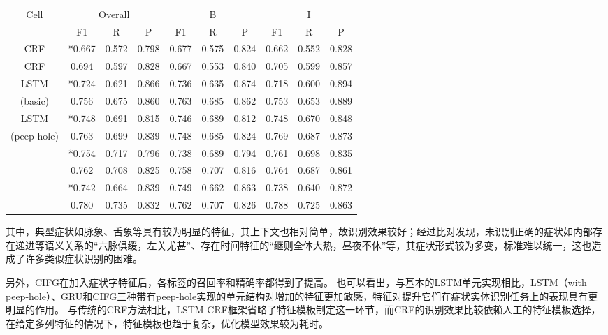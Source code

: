 \begin{table}[H]
    \centering
    \begin{tabular}{cccccccccc}
        \toprule
            \multirow{2}{*}{Cell} &\multicolumn{3}{c}{Overall} &\multicolumn{3}{c}{B} &\multicolumn{3}{c}{I}\\
            \cmidrule(lr){2-4} \cmidrule(lr){5-7} \cmidrule(lr){8-10}
            & F1 & R & P & F1 & R & P & F1 & R & P\\
        \midrule
            CRF & *0.667 & 0.572 & 0.798 & 0.677 & 0.575 & 0.824 & 0.662 & 0.552 & 0.828\\
            CRF & 0.694 & 0.597 & 0.828 & 0.667 & 0.553 & 0.840 & 0.705 & 0.599 & 0.857\\
        \midrule
            LSTM & *0.724 & 0.621 & 0.866 & 0.736 & 0.635 & 0.874 & 0.718 & 0.600 & 0.894\\
            (basic) & 0.756 & 0.675 & 0.860 & 0.763 & 0.685 & 0.862 & 0.753 & 0.653 & 0.889\\
            LSTM & *0.748 & 0.691 & 0.815 & 0.746 & 0.689 & 0.812 & 0.748 & 0.670 & 0.848\\
            (peep-hole) & 0.763 & 0.699 & 0.839 & 0.748 & 0.685 & 0.824 & 0.769 & 0.687 & 0.873\\
            \multirow{2}{2cm}{\centering{GRU}} & *0.754 & 0.717 & 0.796 & 0.738 & 0.689 & 0.794 & 0.761 & 0.698 & 0.835\\
                                 & 0.762 & 0.708 & 0.825 & 0.758 & 0.707 & 0.816 & 0.764 & 0.687 & 0.861\\
            \multirow{2}{2cm}{\centering{CIFG}} & *0.742 & 0.664 & 0.839 & 0.749 & 0.662 & 0.863 & 0.738 & 0.640 & 0.872\\
                                  & 0.780 & 0.735 & 0.832 & 0.762 & 0.707 & 0.826 & 0.788 & 0.725 & 0.863\\
        \bottomrule
    \end{tabular}
    \label{tab:tab1}
\end{table}

其中，典型症状如脉象、舌象等具有较为明显的特征，其上下文也相对简单，故识别效果较好；经过比对发现，未识别正确的症状如内部存在递进等语义关系的“六脉俱缓，左关尤甚”、存在时间特征的“继则全体大热，昼夜不休”等，其症状形式较为多变，标准难以统一，这也造成了许多类似症状识别的困难。

另外，CIFG在加入症状字特征后，各标签的召回率和精确率都得到了提高。
也可以看出，与基本的LSTM单元实现相比，LSTM（with peep-hole）、GRU和CIFG三种带有peep-hole实现的单元结构对增加的特征更加敏感，特征对提升它们在症状实体识别任务上的表现具有更明显的作用。
与传统的CRF方法相比，LSTM-CRF框架省略了特征模板制定这一环节，而CRF的识别效果比较依赖人工的特征模板选择，在给定多列特征的情况下，特征模板也趋于复杂，优化模型效果较为耗时。


